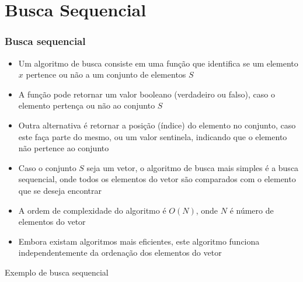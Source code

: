 \section{Busca Sequencial}

\begin{frame}[fragile]\frametitle{Busca sequencial}

	\begin{itemize}
        \item Um algoritmo de busca consiste em uma função que identifica se um elemento $x$
        pertence ou não a um conjunto de elementos $S$

        \item A função pode retornar um valor booleano (verdadeiro ou falso), caso o elemento 
        pertença ou não ao conjunto $S$

        \item Outra alternativa é retornar a posição (índice) do elemento no conjunto, caso
        este faça parte do mesmo, ou um valor sentinela, indicando que o elemento não 
        pertence ao conjunto

		\item Caso o conjunto $S$ seja um vetor, o algoritmo de busca mais simples é a busca 
        sequencial, onde todos os elementos do vetor são comparados com o elemento que se deseja 
        encontrar

		\item A ordem de complexidade do algoritmo é $O(N)$, onde $N$ é número de elementos do vetor

		\item Embora existam algoritmos mais eficientes, este algoritmo funciona independentemente
        da ordenação dos elementos do vetor
	\end{itemize}
 
\end{frame}  

\begin{frame}[fragile]{Exemplo de busca sequencial}


\end{frame}

